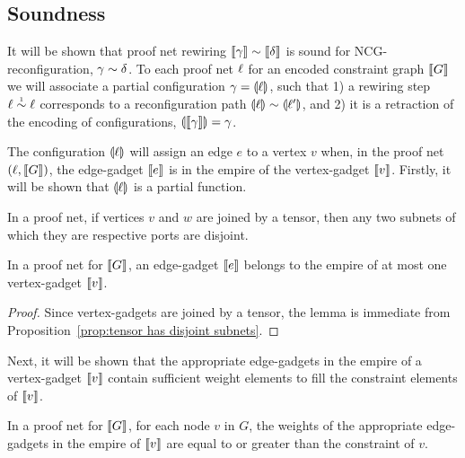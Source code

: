 \documentclass{sigplanconf-modified}
\let\aftersubsection=\noindent
\let\capsabbrev=\uppercase
\begin{document}

\subsection*{Soundness}

\aftersubsection
It will be shown that proof net rewiring $\itn\gamma\perm\itn\delta$ is sound for \capsabbrev{ncg}-reconfiguration, $\gamma\perm\delta$.
%
To each proof net $\ell$ for an encoded constraint graph $\llbracket G\rrbracket$ we will associate a partial configuration $\gamma=\llparenthesis\ell\rrparenthesis$, such that 1) a rewiring step $\links\perm*\links$ corresponds to a reconfiguration path $\coitn\links\perm\coitn{\links'}$, and 2) it is a retraction of the encoding of configurations, $\llparenthesis\llbracket\gamma\rrbracket\rrparenthesis=\gamma$.



The configuration $\llparenthesis\ell\rrparenthesis$ will assign an edge $e$ to a vertex $v$ when, in the proof net $(\ell,\llbracket G\rrbracket)$, the edge-gadget $\llbracket e\rrbracket$ is in the empire of the vertex-gadget $\llbracket v\rrbracket$.
%
Firstly, it will be shown that $\llparenthesis\ell\rrparenthesis$ is a partial function.


\begin{proposition}
\label{prop:tensor has disjoint subnets}
In a proof net, if vertices $v$ and $w$ are joined by a tensor, then any two subnets of which they are respective ports are disjoint.
\end{proposition}


\begin{lemma}
In a proof net for $\llbracket G\rrbracket$, an edge-gadget $\llbracket e\rrbracket$ belongs to the empire of at most one vertex-gadget $\llbracket v\rrbracket$.
\end{lemma}

\begin{proof}
Since vertex-gadgets are joined by a tensor, the lemma is immediate from Proposition~\ref{prop:tensor has disjoint subnets}.
\end{proof}


Next, it will be shown that the appropriate edge-gadgets in the empire of a vertex-gadget $\llbracket v\rrbracket$ contain sufficient weight elements to fill the constraint elements of $\llbracket v\rrbracket$.


\begin{lemma}
\label{lem:appropriate edge weights}
In a proof net for $\llbracket G\rrbracket$, for each node $v$ in $G$, the weights of the appropriate edge-gadgets in the empire of $\llbracket v\rrbracket$ are equal to or greater than the constraint of $v$.
\end{lemma}
\end{document}
